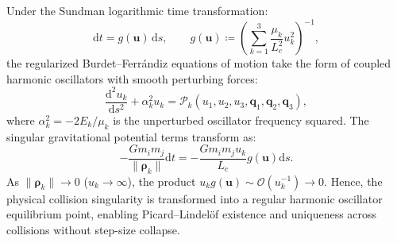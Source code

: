 \documentclass[11pt,a4paper,reqno]{article}
\theoremstyle{plain}
\theoremstyle{definition}
\theoremstyle{remark}
\numberwithin{equation}{section}
\numberwithin{table}{section}
\providecommand{\diff}{\mathrm{d}}
\begin{document}
Under the Sundman logarithmic time transformation:
\begin{equation}
  \diff t = g(\bm{u}) \, \diff s, \qquad g(\bm{u}) \coloneqq \left( \sum_{k=1}^3 \frac{\mu_k}{L_c^2} u_k^2 \right)^{-1},
  \label{eq:sundman_transformation}
\end{equation}
the regularized Burdet--Ferr\'andiz equations of motion take the form of coupled harmonic oscillators with smooth perturbing forces:
\begin{equation}
  \frac{\diff^2 u_k}{\diff s^2} + \alpha_k^2 u_k = \mathcal{P}_k(u_1, u_2, u_3, \bm{q}_1, \bm{q}_2, \bm{q}_3),
  \label{eq:mbf20_harmonic_oscillators}
\end{equation}
where $\alpha_k^2 = -2 E_k / \mu_k$ is the unperturbed oscillator frequency squared. The singular gravitational potential terms transform as:
\begin{equation}
  - \frac{G m_i m_j}{\|\bm{\rho}_k\|} \diff t = - \frac{G m_i m_j u_k}{L_c} g(\bm{u}) \diff s.
\end{equation}
As $\|\bm{\rho}_k\| \to 0$ ($u_k \to \infty$), the product $u_k g(\bm{u}) \sim \mathcal{O}(u_k^{-1}) \to 0$. Hence, the physical collision singularity is transformed into a regular harmonic oscillator equilibrium point, enabling Picard--Lindel\"of existence and uniqueness across collisions without step-size collapse.
\end{document}
